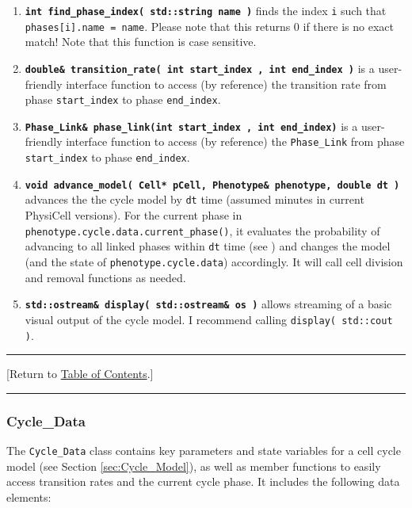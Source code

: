 \documentclass[12pt]{article}
\renewcommand{\v}{\verb}
\newcommand{\smallcode}[1]{\textbf{\texttt{#1}}}
\newcommand{\blue}[1]{\textcolor{blue}{#1}}
\newcommand{\DONE}{}%
\newcommand{\TOClink}{\begin{center}\hrule\vskip-5pt\phantom{.}\hfill[Return to \hyperlink{TOC}{Table of Contents}.]\hfill\phantom{.}\vskip3pt\hrule\end{center}}
\begin{document}
\begin{enumerate}
\item
\smallcode{int find\_phase\_index( std::string name )} finds the index \v|i| such that 
\v|phases[i].name = name|. Please note that this returns 0 if there is 
no exact match! Note that this function is case sensitive. 

\item 
\smallcode{double\& transition\_rate( int start\_index , int end\_index )} is a user-friendly interface function 
to access (by reference) the transition rate from phase \v|start_index| to phase 
\v|end_index|. 

\item 
\smallcode{Phase\_Link\& phase\_link(int start\_index , int end\_index)} is a user-friendly interface function 
to access (by reference) the \v|Phase_Link| from phase \v|start_index| to phase 
\v|end_index|. 

\item 
\smallcode{void advance\_model( Cell* pCell, Phenotype\& phenotype, double dt )} advances the the cycle model by 
\v|dt| time (assumed minutes in current PhysiCell versions). For the current phase \hfill\break
in \v|phenotype.cycle.data.current_phase()|, it evaluates the probability of advancing 
to all linked phases within \v|dt| time (see \cite{ref:PhysiCell}) and changes the model 
(and the state of \v|phenotype.cycle.data|) accordingly. It will call 
cell division and removal functions as needed. 

\item 
\smallcode{std::ostream\& display( std::ostream\& os )} allows streaming of a basic visual output of the 
cycle model. I recommend calling \v|display( std::cout )|.      

\end{enumerate}

\TOClink 

\subsubsection{Cycle\_Data \DONE}
\label{sec:Cycle_Data}
The \v|Cycle_Data| class contains key parameters and state variables for a 
cell cycle model (see Section \ref{sec:Cycle_Model}), as well as member functions to easily 
access transition rates and the current cycle phase. 
It includes the following data elements: 
\end{document}
